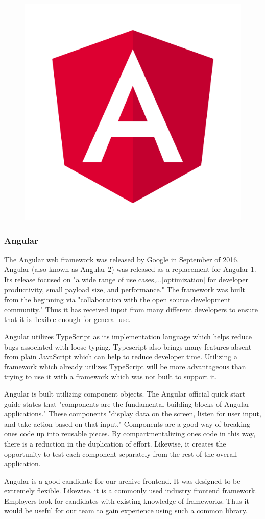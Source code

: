 \documentclass[12pt]{article}
\begin{document}
\begin{figure}[h]
	\centering
	\includegraphics[width=0.251\linewidth]{angular}
\end{figure}

\subsubsection{Angular}

The Angular web framework was released by Google in September of 2016.\cite{angularrelease} Angular (also known as Angular 2) was released as a replacement for Angular 1. Its release focused on "a wide range of use cases,...[optimization] for developer productivity, small payload size, and performance."\cite{angularrelease} The framework was built from the beginning via "collaboration with the open source development community."\cite{angularrelease} Thus it has received input from many different developers to ensure that it is flexible enough for general use.

Angular utilizes TypeScript as its implementation language which helps reduce bugs associated with loose typing. Typescript also brings many features absent from plain JavaScript which can help to reduce developer time. Utilizing a framework which already utilizes TypeScript will be more advantageous than trying to use it with a framework which was not built to support it.

Angular is built utilizing component objects. The Angular official quick start guide states that "components are the fundamental building blocks of Angular applications."\cite{angularquickstart} These components "display data on the screen, listen for user input, and take action based on that input."\cite{angularquickstart} Components are a good way of breaking ones code up into reusable pieces. By compartmentalizing ones code in this way, there is a reduction in the duplication of effort. Likewise, it creates the opportunity to test each component separately from the rest of the overall application.

Angular is a good candidate for our archive frontend. It was designed to be extremely flexible. Likewise, it is a commonly used industry frontend framework. Employers look for candidates with existing knowledge of frameworks. Thus it would be useful for our team to gain experience using such a common library.
\end{document}
